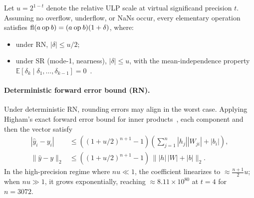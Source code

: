 Let $u = 2^{1-t}$ denote the relative ULP scale at virtual significand precision $t$.
Assuming no overflow, underflow, or NaNs occur, every elementary operation satisfies
$\mathrm{fl}(a \mathbin{\mathrm{op}} b) = (a \mathbin{\mathrm{op}} b)(1 + \delta)$, where:
\begin{itemize}[leftmargin=1.5em]
  \item under RN, $|\delta| \le u/2$;
  \item under SR (mode-1, nearness), $|\delta| \le u$, with the mean-independence
        property $\mathbb{E}[\delta_k \mid \delta_1, \dots, \delta_{k-1}] = 0$~\citep[Lemma~5.2]{connolly2021stochastic}.
\end{itemize}

\paragraph{Deterministic forward error bound (RN).}
Under deterministic RN, rounding errors may align in the worst case. Applying Higham's
exact forward error bound for inner products~\citep[Lemma~3.1]{higham2002accuracy}, each component
and then the vector satisfy
\begin{align*}
  |\hat{y}_i - y_i| &\le \left( (1 + u/2)^{n+1} - 1 \right) \left( \sum_{j=1}^{n} |h_j| |W_{ji}| + |b_i| \right), \\
  \|\hat{y} - y\|_2 &\le \left( (1 + u/2)^{n+1} - 1 \right) \, \| |h| \, |W| + |b| \|_2.
\end{align*}
In the high-precision regime where $nu \ll 1$, the coefficient linearizes to $\approx \frac{n+1}{2} u$;
when $nu \gg 1$, it grows exponentially, reaching $\approx 8.11 \times 10^{80}$ at $t = 4$ for $n=3072$.

